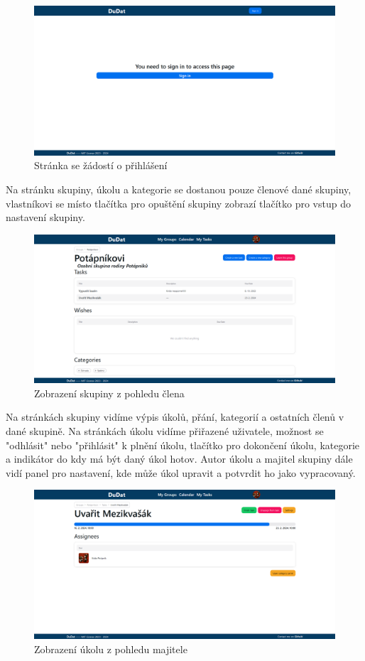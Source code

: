 \begin{figure}[hbt!]
	\centering
	\includegraphics[width=1\linewidth]{img/signIn.png}
	\caption{Stránka se žádostí o přihlášení}
\end{figure}
Na stránku skupiny, úkolu a kategorie se dostanou pouze členové dané skupiny, vlastníkovi se místo tlačítka pro opuštění skupiny zobrazí tlačítko pro vstup do nastavení skupiny.
\begin{figure}[hbt!]
	\centering
	\includegraphics[width=1\linewidth]{img/groupPage.png}
	\caption{Zobrazení skupiny z pohledu člena}
\end{figure}
Na stránkách skupiny vidíme výpis úkolů, přání, kategorií a ostatních členů v dané skupině. Na stránkách úkolu vidíme přiřazené uživatele, možnost se "odhlásit" nebo "přihlásit" k plnění úkolu, tlačítko pro dokončení úkolu, kategorie a indikátor do kdy má být daný úkol hotov. Autor úkolu a majitel skupiny dále vidí panel pro nastavení, kde může úkol upravit a potvrdit ho jako vypracovaný.

\begin{figure}[hbt!]
	\centering
	\includegraphics[width=1\linewidth]{img/ukol.png}
	\caption{Zobrazení úkolu z pohledu majitele\cite{mezikvasak}}
\end{figure}



